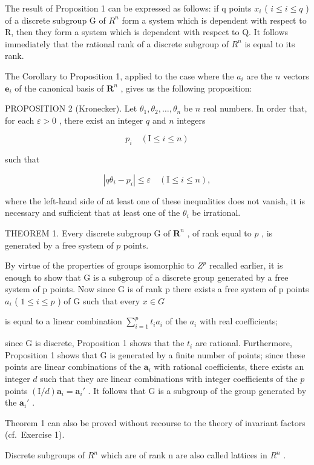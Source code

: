 The result of Proposition 1 can be expressed as follows: if q points \(x_{i}\) ( \(i \leqslant i \leqslant q\) ) of a discrete subgroup G of \(R^{n}\) form a system which is dependent with respect to R, then they form a system which is dependent with respect to Q. It follows immediately that the rational rank of a discrete subgroup of \(R^{n}\) is equal to its rank.

The Corollary to Proposition 1, applied to the case where the \(a_{i}\) are the \(n\) vectors \(\pmb{e}_{i}\) of the canonical basis of \(\mathbf{R}^{n}\) , gives us the following proposition:

PROPOSITION 2 (Kronecker). Let \(\theta_{1}, \theta_{2}, \ldots, \theta_{n}\) be \(n\) real numbers. In order that, for each \(\varepsilon > 0\) , there exist an integer \(q\) and \(n\) integers

\[
p _ {i} \quad (\mathrm{I} \leqslant i \leqslant n)
\]

such that

\[
\left| q \theta_ {i} - p _ {i} \right| \leqslant \varepsilon \quad (\mathrm{I} \leqslant i \leqslant n),
\]

where the left-hand side of at least one of these inequalities does not vanish, it is necessary and sufficient that at least one of the \(\theta_{i}\) be irrational.

THEOREM 1. Every discrete subgroup G of \(\mathbf{R}^n\) , of rank equal to \(p\) , is generated by a free system of \(p\) points.

By virtue of the properties of groups isomorphic to \(Z^{p}\) recalled earlier, it is enough to show that G is a subgroup of a discrete group generated by a free system of p points. Now since G is of rank p there exists a free system of p points \(a_{i}\) ( \(1 \leqslant i \leqslant p\) ) of G such that every \(x \in G\)

is equal to a linear combination \(\sum_{i=1}^{p} t_i a_i\) of the \(a_i\) with real coefficients;

since G is discrete, Proposition 1 shows that the \(t_i\) are rational. Furthermore, Proposition 1 shows that G is generated by a finite number of points; since these points are linear combinations of the \(\boldsymbol{a}_i\) with rational coefficients, there exists an integer \(d\) such that they are linear combinations with integer coefficients of the \(p\) points \((\mathrm{I}/d)\boldsymbol{a}_i = \boldsymbol{a}_i'\) . It follows that G is a subgroup of the group generated by the \(\boldsymbol{a}_i'\) .

Theorem 1 can also be proved without recourse to the theory of invariant factors (cf.~Exercise 1).

Discrete subgroups of \(R^{n}\) which are of rank n are also called lattices in \(R^{n}\) .


